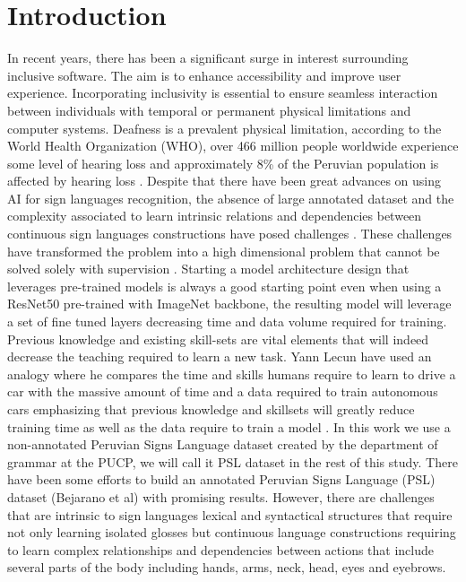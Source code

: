 \documentclass[twocolumn,conference]{article}
\begin{document}
\section{Introduction}\label{Introduction}
In recent years, there has been a significant surge in interest surrounding inclusive software. The aim is to enhance accessibility and improve user experience. Incorporating inclusivity is essential to ensure seamless interaction between individuals with temporal or permanent physical limitations and computer systems. Deafness is a prevalent physical limitation, according to the World Health Organization (WHO), over 466 million people worldwide experience some level of hearing loss \cite{deafness_and_hearing_loss_2020} and approximately 8\% of the Peruvian population is affected by hearing loss \cite{disabilities_survey_2012}. Despite that there have been great advances on using AI for sign languages recognition, the absence of large annotated dataset and the complexity associated to learn intrinsic relations and dependencies between continuous sign languages constructions have posed challenges \cite{adaloglou2020comprehensive}. These challenges  have transformed the problem into a high dimensional problem that cannot be solved solely with supervision \cite{facebook-ssl}. Starting a model architecture design that leverages pre-trained models is always a good starting point even when using a ResNet50 pre-trained with ImageNet backbone, the resulting model will leverage a set of fine tuned layers decreasing time and data volume required for training. Previous knowledge and existing skill-sets are vital elements that will indeed decrease the teaching required to learn a new task. Yann Lecun have used an analogy where he compares the time and skills humans require to learn to drive a car with the massive amount of time and a data required to train autonomous cars emphasizing that previous knowledge and skillsets will greatly reduce training time as well as the data require to train a model \cite{facebook-ssl}.
In this work we use a non-annotated Peruvian Signs Language dataset created by the department of grammar at the PUCP, we will call it PSL dataset in the rest of this study. There have been some efforts to build an annotated Peruvian Signs Language (PSL) dataset (Bejarano et al) with promising results. However, there are challenges that are intrinsic to sign languages lexical and syntactical structures that require not only learning isolated glosses but continuous language constructions requiring to learn complex relationships and dependencies between actions that include several parts of the body including hands, arms, neck, head, eyes and eyebrows. 
\end{document}
